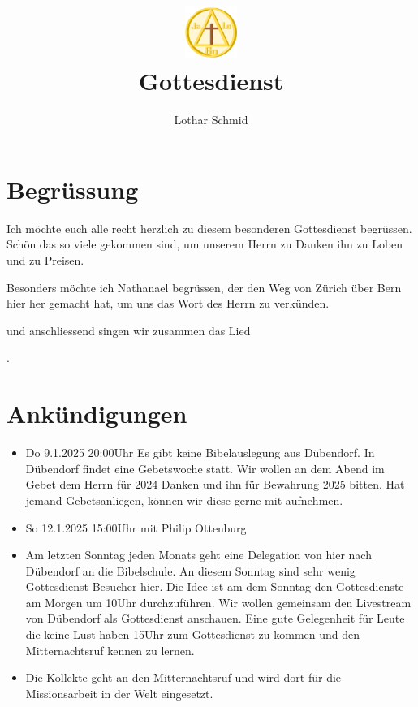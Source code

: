 \documentclass{../inc/mybib}
\title{\includegraphics[height=48pt]{../../assets/images/logo.png}\\Gottesdienst}
\author{Lothar Schmid}
\begin{document}
\maketitle
\section{Begrüssung}

Ich möchte euch alle recht herzlich zu diesem besonderen Gottesdienst begrüssen. Schön das so viele gekommen sind, um unserem Herrn zu Danken ihn zu Loben und zu Preisen.

Besonders möchte ich Nathanael begrüssen, der den Weg von Zürich über Bern hier her gemacht hat, um uns das Wort des Herrn zu verkünden. 

\noindent
\beten{} und anschliessend singen wir zusammen das Lied

\noindent
{}.

\section{Ankündigungen}
\begin{itemize}
    \item {} Do 9.1.2025 20:00Uhr Es gibt keine Bibelauslegung aus Dübendorf. In Dübendorf findet eine Gebetswoche statt. Wir wollen an dem Abend im Gebet dem Herrn für 2024 Danken und ihn für Bewahrung 2025 bitten. Hat jemand Gebetsanliegen, können wir diese gerne mit aufnehmen.
    \item {} So 12.1.2025 15:00Uhr mit Philip Ottenburg
    \item {} Am letzten Sonntag jeden Monats geht eine Delegation von hier nach Dübendorf an die Bibelschule. An diesem Sonntag sind sehr wenig Gottesdienst Besucher hier. Die Idee ist am dem Sonntag den Gottesdienste am Morgen um 10Uhr durchzuführen. Wir wollen gemeinsam den Livestream von Dübendorf als Gottesdienst anschauen. Eine gute Gelegenheit für Leute die keine Lust haben 15Uhr zum Gottesdienst zu kommen und den Mitternachtsruf kennen zu lernen.
    \item {} Die Kollekte geht an den Mitternachtsruf und wird dort für die Missionsarbeit in der Welt eingesetzt.
\end{itemize}
\end{document}
